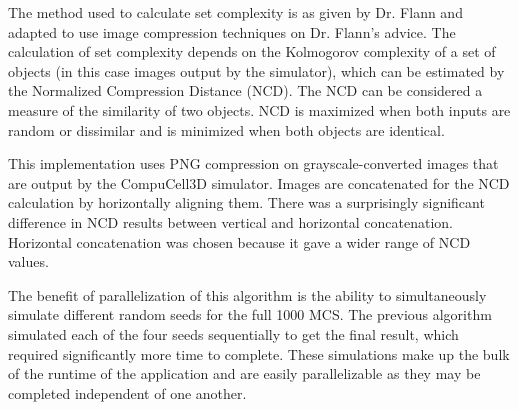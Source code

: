 The method used to calculate set complexity is as given by Dr. Flann and adapted to use image compression techniques on Dr. Flann's advice. The calculation of set complexity depends on the Kolmogorov complexity of a set of objects (in this case images output by the simulator), which can be estimated by the Normalized Compression Distance (NCD). The NCD can be considered a measure of the similarity of two objects. NCD is maximized when both inputs are random or dissimilar and is minimized when both objects are identical.

This implementation uses PNG compression on grayscale-converted images that are output by the CompuCell3D simulator. Images are concatenated for the NCD calculation by horizontally aligning them. There was a surprisingly significant difference in NCD results between vertical and horizontal concatenation. Horizontal concatenation was chosen because it gave a wider range of NCD values.

The benefit of parallelization of this algorithm is the ability to simultaneously simulate different random seeds for the full 1000 MCS. The previous algorithm simulated each of the four seeds sequentially to get the final result, which required significantly more time to complete. These simulations make up the bulk of the runtime of the application and are easily parallelizable as they may be completed independent of one another.
